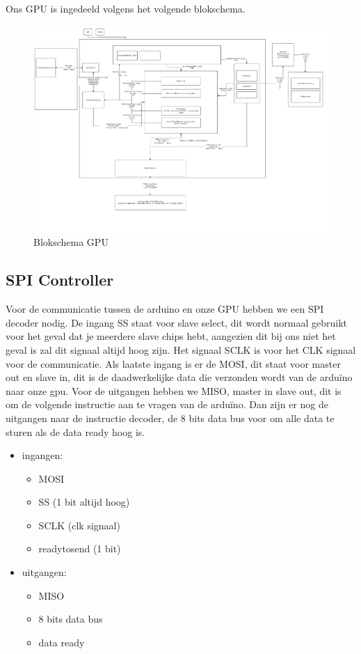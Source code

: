 
Ons GPU is ingedeeld volgens het volgende blokschema.
\begin{figure}[H]
\centering
        \includegraphics[width=\linewidth]{inputfiles/systeemdrawing-rc.pdf}
        \caption{Blokschema GPU}
        \label{fig:Blokschema GPU}
\end{figure}


\subsection{SPI Controller}
Voor de communicatie tussen de arduino en onze GPU hebben we een SPI decoder nodig. De ingang SS staat voor slave select, dit wordt normaal gebruikt voor het geval dat je meerdere slave chips hebt, aangezien dit bij ons niet het geval is zal dit signaal altijd hoog zijn. Het signaal SCLK is voor het CLK signaal voor de communicatie. Als laatste ingang is er de MOSI, dit staat voor master out en slave in, dit is de daadwerkelijke data die verzonden wordt van de arduïno naar onze gpu. Voor de uitgangen hebben we MISO, master in slave out, dit is om de volgende instructie aan te vragen van de arduïno. Dan zijn er nog de uitgangen naar de instructie decoder, de 8 bits data bus voor om alle data te sturen als de data ready hoog is.

\begin {itemize}
\item ingangen:
\begin {itemize}
\item MOSI 
\item SS (1 bit altijd hoog)
\item SCLK (clk signaal)
\item readytosend (1 bit)
\end {itemize}
\item uitgangen:
\begin {itemize}
\item MISO
\item 8 bits data bus
\item data ready
\end {itemize}
\end {itemize}

